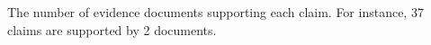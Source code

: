 \begin{table}[H]
  \centering
  \caption{The number of evidence documents supporting each claim. For instance, 37 claims are supported by 2 documents.}
  \label{tbl:n_evidence_docs}
\end{table}